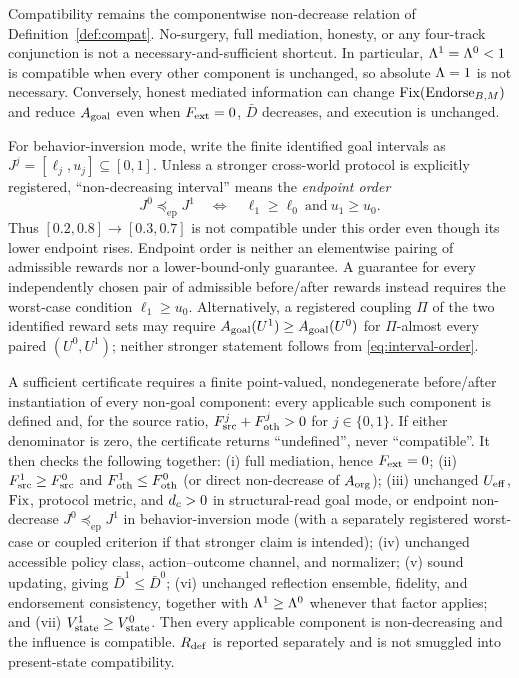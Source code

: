 \begin{proposition}
\label{cor:t2}
Compatibility remains the componentwise non-decrease relation of
Definition~\ref{def:compat}. No-surgery, full mediation, honesty, or any
four-track conjunction is not a necessary-and-sufficient shortcut. In
particular, $\Lambda^1=\Lambda^0<1$ is compatible when every other component is
unchanged, so absolute $\Lambda=1$ is not necessary. Conversely, honest mediated
information can change $\mathrm{Fix}(\mathrm{Endorse}_{B,M})$ and reduce $A_{\mathrm{goal}}$ even when
$F_{\mathrm{ext}}=0$, $\bar D$ decreases, and execution is unchanged.

For behavior-inversion mode, write the finite identified goal intervals as
$J^j=[\ell_j,u_j]\subseteq[0,1]$. Unless a stronger cross-world protocol is explicitly
registered, ``non-decreasing interval'' means the \emph{endpoint order}
\begin{equation}\label{eq:interval-order}
J^0\preceq_{\mathrm{ep}}J^1
\quad\Longleftrightarrow\quad
\ell_1\ge\ell_0\ \text{and}\ u_1\ge u_0 .
\end{equation}
Thus $[0.2,0.8]\to[0.3,0.7]$ is not compatible under this order even though
its lower endpoint rises. Endpoint order is neither an elementwise pairing of
admissible rewards nor a lower-bound-only guarantee. A guarantee for every
independently chosen pair of admissible before/after rewards instead requires
the worst-case condition $\ell_1\ge u_0$. Alternatively, a registered coupling
$\Pi$ of the two identified reward sets may require
$A_{\mathrm{goal}}(U^1)\ge A_{\mathrm{goal}}(U^0)$ for $\Pi$-almost every paired $(U^0,U^1)$; neither
stronger statement follows from \eqref{eq:interval-order}.

A sufficient certificate requires a finite point-valued, nondegenerate
before/after instantiation of every non-goal component: every applicable such component is
defined and, for the source ratio,
$F_{\mathrm{src}}^j+F_{\mathrm{oth}}^j>0$ for $j\in\{0,1\}$. If either denominator is zero, the
certificate returns ``undefined'', never ``compatible''. It then checks the
following together:
\textup{(i)} full mediation, hence $F_{\mathrm{ext}}=0$;
\textup{(ii)} $F_{\mathrm{src}}^1\ge F_{\mathrm{src}}^0$ and $F_{\mathrm{oth}}^1\le F_{\mathrm{oth}}^0$ (or direct
non-decrease of $A_{\mathrm{org}}$);
\textup{(iii)} unchanged $U_{\mathrm{eff}}$, $\mathrm{Fix}$, protocol metric, and $d_{c}>0$ in
structural-read goal mode, or endpoint non-decrease
$J^0\preceq_{\mathrm{ep}}J^1$ in behavior-inversion mode (with a separately
registered worst-case or coupled criterion if that stronger claim is intended);
\textup{(iv)} unchanged accessible policy class, action--outcome channel, and
normalizer;
\textup{(v)} sound updating, giving $\bar D^1\le\bar D^0$;
\textup{(vi)} unchanged reflection ensemble, fidelity, and endorsement
consistency, together with $\Lambda^1\ge\Lambda^0$ whenever that factor applies;
and \textup{(vii)} $V_{\mathrm{state}}^1\ge V_{\mathrm{state}}^0$. Then every applicable component is
non-decreasing and the influence is compatible. $R_{\mathrm{def}}$ is reported
separately and is not smuggled into present-state compatibility.


\end{proposition}
